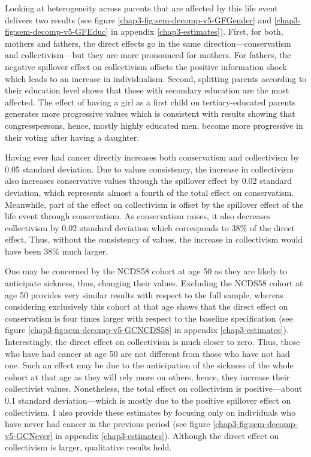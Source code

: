 Looking at heterogeneity across parents that are affected by this life event delivers two results (see figure \ref{chap3-fig:sem-decomp-v5-GFGender} and \ref{chap3-fig:sem-decomp-v5-GFEduc} in appendix \ref{chap3-estimates}). 
First, for both, mothers and fathers, the direct effects go in the same direction---conservatism and collectivism---but they are more pronounced for mothers. For fathers, the negative spillover effect on collectivism offsets the positive information shock which leads to an increase in individualism. 
Second, splitting parents according to their education level shows that those with secondary education are the most affected. The effect of having a girl as a first child on tertiary-educated parents generates more progressive values which is consistent with \citet{Washington2008Female} results showing that congresspersons, hence, mostly highly educated men, become more progressive in their voting after having a daughter.

Having ever had cancer directly increases both conservatism and collectivism by 0.05 standard deviation. Due to values consistency, the increase in collectivism also increases conservative values through the spillover effect by 0.02 standard deviation, which represents almost a fourth of the total effect on conservatism. Meanwhile, part of the effect on collectivism is offset by the spillover effect of the life event through conservatism. As conservatism raises, it also decreases collectivism by 0.02 standard deviation which corresponds to 38\% of the direct effect. Thus, without the consistency of values, the increase in collectivism would have been 38\% much larger.

One may be concerned by the NCDS58 cohort at age 50 as they are likely to anticipate sickness, thus, changing their values. Excluding the NCDS58 cohort at age 50 provides very similar results with respect to the full sample, whereas considering exclusively this cohort at that age shows that the direct effect on conservatism is four times larger with respect to the baseline specification (see figure \ref{chap3-fig:sem-decomp-v5-GCNCDS58} in appendix \ref{chap3-estimates}). Interestingly, the direct effect on collectivism is much closer to zero. Thus, those who have had cancer at age 50 are not different from those who have not had one. Such an effect may be due to the anticipation of the sickness of the whole cohort at that age as they will rely more on others, hence, they increase their collectivist values. Nonetheless, the total effect on collectivism is positive---about 0.1 standard deviation---which is mostly due to the positive spillover effect on collectivism.
I also provide these estimates by focusing only on individuals who have never had cancer in the previous period (see figure \ref{chap3-fig:sem-decomp-v5-GCNever} in appendix \ref{chap3-estimates}). Although the direct effect on collectivism is larger, qualitative results hold.

